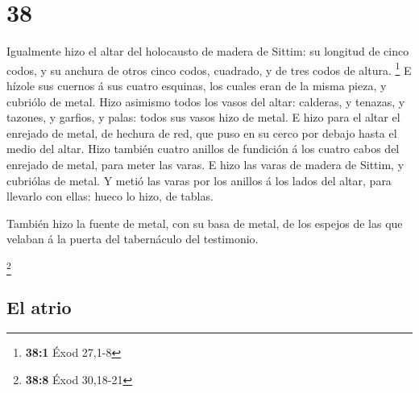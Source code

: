 \hypertarget{section-37}{%
\section{38}\label{section-37}}

 Igualmente hizo el altar del holocausto de madera de
Sittim: su longitud de cinco codos, y su anchura de otros cinco codos,
cuadrado, y de tres codos de altura. \footnote{\textbf{38:1} Éxod 27,1-8}
 E hízole sus cuernos á sus cuatro esquinas, los cuales eran
de la misma pieza, y cubriólo de metal.  Hizo asimismo todos
los vasos del altar: calderas, y tenazas, y tazones, y garfios, y palas:
todos sus vasos hizo de metal.  E hizo para el altar el
enrejado de metal, de hechura de red, que puso en su cerco por debajo
hasta el medio del altar.  Hizo también cuatro anillos de
fundición á los cuatro cabos del enrejado de metal, para meter las
varas.  E hizo las varas de madera de Sittim, y cubriólas de
metal.  Y metió las varas por los anillos á los lados del
altar, para llevarlo con ellas: hueco lo hizo, de tablas.

 También hizo la fuente de metal, con su basa de metal, de
los espejos de las que velaban á la puerta del tabernáculo del
testimonio.

\footnote{\textbf{38:8} Éxod 30,18-21}

\hypertarget{el-atrio}{%
\subsection{El atrio}\label{el-atrio}}

